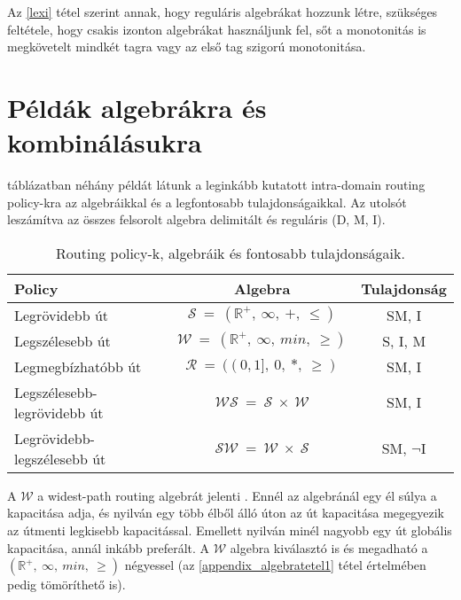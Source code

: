    Az \eqref{lexi} tétel szerint annak, hogy reguláris algebrákat hozzunk létre, szükséges feltétele, hogy csakis izonton algebrákat használjunk fel, sőt a monotonitás is megkövetelt mindkét tagra vagy az első tag szigorú monotonitása.

  \section{Példák algebrákra és kombinálásukra}\label{sect:section_algebrapeldak}

   táblázatban néhány példát látunk a leginkább kutatott intra-domain routing policy-kra az algebráikkal és a legfontosabb tulajdonságaikkal. Az utolsót leszámítva az összes felsorolt algebra delimitált és reguláris (D, M, I).

  \begin{table}[ht]
    \footnotesize
    \centering
    \caption{Routing policy-k, algebráik és fontosabb tulajdonságaik.}
    \begin{tabular}{ | l | c | c |}
    \hline
    Policy & Algebra & Tulajdonság\\
    \hline
    Legrövidebb út & $\mathcal{S}~=~(\mathbb{R}^{+},~\infty,~+,~\leq)$ & SM, I\\
    Legszélesebb út & $\mathcal{W}~=~(\mathbb{R}^{+},~\infty,~min,~\geq)$ & S, I, M\\
    Legmegbízhatóbb út &  $\mathcal{R}~=~((0,1],~0,~*,~\geq)$ & SM, I\\
    Legszélesebb-legrövidebb út & $\mathcal{WS}~=~\mathcal{S}~\times~\mathcal{W}$ & SM, I\\
    Legrövidebb-legszélesebb út & $\mathcal{SW}~=~\mathcal{W}~\times~\mathcal{S}$ & SM, $\neg$I\\
    \hline
    \end{tabular}\label{tab:table_algebrapeldak}
  \end{table}

  A $\mathcal{W}$ a widest-path routing algebrát jelenti \cite{Quality_of_service_routing_for_supporting_multimedia_applications}. Ennél az algebránál egy él súlya a kapacitása adja, és nyilván egy több élből álló úton az út kapacitása megegyezik az útmenti legkisebb kapacitással. Emellett nyilván minél nagyobb egy út globális kapacitása, annál inkább preferált. A $\mathcal{W}$ algebra kiválasztó is és megadható a $(\mathbb{R}^{+},~\infty,~min,~\geq)$ négyessel (az \eqref{appendix_algebratetel1} tétel értelmében pedig tömöríthető is).

